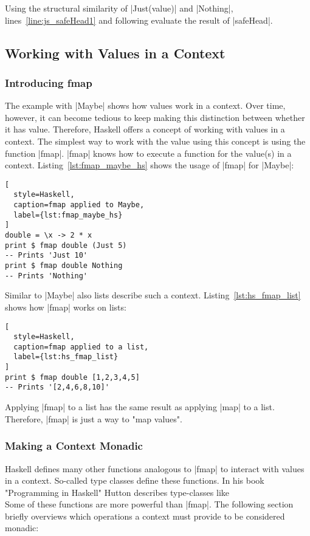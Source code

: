 Using the structural similarity of |Just(value)| and |Nothing|,
lines~\ref{line:js_safeHead1} and following evaluate the result of |safeHead|.

\subsection{Working with Values in a Context} %
\label{sub:Working with values in a context}
\subsubsection{Introducing fmap} %
\label{subsub:Introducing fmap}
The example with |Maybe| shows how values work in a context. Over time,
however, it can become tedious to keep making this distinction between whether
it has value. Therefore, Haskell offers a concept of working with values in a
context. The simplest way to work with the value using this concept is using
the function |fmap|. |fmap| knows how to execute a function for the value(s) in
a context. Listing~\ref{lst:fmap_maybe_hs} shows the usage of |fmap| for
|Maybe|:

\begin{lstlisting}[
  style=Haskell,
  caption=fmap applied to Maybe,
  label={lst:fmap_maybe_hs}
]
double = \x -> 2 * x
print $ fmap double (Just 5)
-- Prints 'Just 10' 
print $ fmap double Nothing
-- Prints 'Nothing'
\end{lstlisting}

Similar to |Maybe| also lists describe such a context.
Listing~\ref{lst:hs_fmap_list} shows how |fmap| works on lists:

\begin{lstlisting}[
  style=Haskell,
  caption=fmap applied to a list,
  label={lst:hs_fmap_list}
]
print $ fmap double [1,2,3,4,5]
-- Prints '[2,4,6,8,10]'
\end{lstlisting}

Applying |fmap| to a list has the same result as applying |map| to a list.
Therefore, |fmap| is just a way to "map values".

\subsubsection{Making a Context Monadic} %
\label{sec:Making a Context Monadic}
Haskell defines many other functions analogous to |fmap| to interact with
values in a context. So-called type classes define these functions. In his book
"Programming in Haskell" Hutton describes type-classes like
\\ 
Some of these functions are more powerful than |fmap|. The following section
briefly overviews which operations a context must provide to be considered
monadic:

